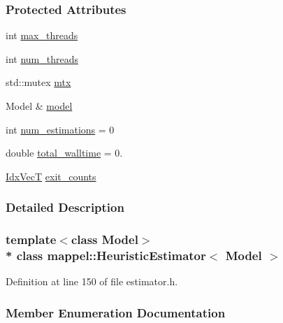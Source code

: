 \subsubsection*{Protected Attributes}
\begin{DoxyCompactItemize}
\item 
int \hyperlink{classmappel_1_1ThreadedEstimator_a31391f8aaab3484f58bfdedbdb22be42}{max\+\_\+threads}
\item 
int \hyperlink{classmappel_1_1ThreadedEstimator_a6afa05d7d971f3317ce1602de853123b}{num\+\_\+threads}
\item 
std\+::mutex \hyperlink{classmappel_1_1ThreadedEstimator_a4538fd0860243430bfd47e8064c8cfe4}{mtx}
\item 
Model \& \hyperlink{classmappel_1_1Estimator_a8322546d87ccdf01f8b0dcd9dae509f0}{model}
\item 
int \hyperlink{classmappel_1_1Estimator_ab15b88435d6c50a68fac84465d950b12}{num\+\_\+estimations} = 0
\item 
double \hyperlink{classmappel_1_1Estimator_a5a408458a111c5222193871fa6bb6644}{total\+\_\+walltime} = 0.
\item 
\hyperlink{namespacemappel_ac63743dcd42180127307cd0e4ecdd784}{Idx\+VecT} \hyperlink{classmappel_1_1Estimator_a490b648fdbd7ddae7ce41fbf26e29b48}{exit\+\_\+counts}
\end{DoxyCompactItemize}


\subsubsection{Detailed Description}
\subsubsection*{template$<$class Model$>$\\*
class mappel\+::\+Heuristic\+Estimator$<$ Model $>$}



Definition at line 150 of file estimator.\+h.



\subsubsection{Member Enumeration Documentation}
